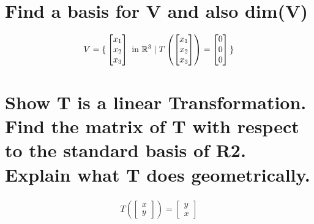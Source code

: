 \documentclass{assignment}
\begin{document}
\section{Find a basis for V and also dim(V)}
\begin{align}
  V = \set{
    \begin{bmatrix}
      x_1 \\
      x_2 \\
      x_3
    \end{bmatrix}
    \mbox{ in }
    \mathbb{R}^3
    \mid
    T\left(
    \begin{bmatrix}
      x_1 \\
      x_2 \\
      x_3
    \end{bmatrix}
    \right) = \begin{bmatrix}
      0 \\
      0 \\
      0
    \end{bmatrix}
  }
\end{align}

\newpage

\section{Show T is a linear Transformation. Find the matrix of T with respect to the standard basis of R2. Explain what T does geometrically.}
\begin{align}
  T\left(
  \begin{bmatrix}
    x \\
    y
  \end{bmatrix}
  \right) = \begin{bmatrix}
    y \\
    x
  \end{bmatrix}
\end{align}
\end{document}
